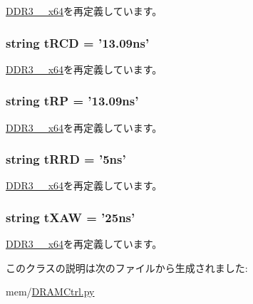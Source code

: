 \hyperlink{classDRAMCtrl_1_1DDR3__1600__x64_a1b5f15dad9d492ce5d0167e1581de8cc}{DDR3\_\_\-x64}を再定義しています。\hypertarget{classDRAMCtrl_1_1DDR3__2133__x64_a31691ebf1f58ff89b00f261f5adea8e2}{
\subsubsection[{tRCD}]{\setlength{\rightskip}{0pt plus 5cm}string {\bf tRCD} = '13.09ns'}}
\label{classDRAMCtrl_1_1DDR3__2133__x64_a31691ebf1f58ff89b00f261f5adea8e2}


\hyperlink{classDRAMCtrl_1_1DDR3__1600__x64_a31691ebf1f58ff89b00f261f5adea8e2}{DDR3\_\_\-x64}を再定義しています。\hypertarget{classDRAMCtrl_1_1DDR3__2133__x64_aeda425967c3cf2880bdc1640e9733439}{
\subsubsection[{tRP}]{\setlength{\rightskip}{0pt plus 5cm}string {\bf tRP} = '13.09ns'}}
\label{classDRAMCtrl_1_1DDR3__2133__x64_aeda425967c3cf2880bdc1640e9733439}


\hyperlink{classDRAMCtrl_1_1DDR3__1600__x64_aeda425967c3cf2880bdc1640e9733439}{DDR3\_\_\-x64}を再定義しています。\hypertarget{classDRAMCtrl_1_1DDR3__2133__x64_ad1724b7d6484bbc6051f43d4ae9e16d2}{
\subsubsection[{tRRD}]{\setlength{\rightskip}{0pt plus 5cm}string {\bf tRRD} = '5ns'}}
\label{classDRAMCtrl_1_1DDR3__2133__x64_ad1724b7d6484bbc6051f43d4ae9e16d2}


\hyperlink{classDRAMCtrl_1_1DDR3__1600__x64_ad1724b7d6484bbc6051f43d4ae9e16d2}{DDR3\_\_\-x64}を再定義しています。\hypertarget{classDRAMCtrl_1_1DDR3__2133__x64_a94c112e585153e09e803751da3cfafcd}{
\subsubsection[{tXAW}]{\setlength{\rightskip}{0pt plus 5cm}string {\bf tXAW} = '25ns'}}
\label{classDRAMCtrl_1_1DDR3__2133__x64_a94c112e585153e09e803751da3cfafcd}


\hyperlink{classDRAMCtrl_1_1DDR3__1600__x64_a94c112e585153e09e803751da3cfafcd}{DDR3\_\_\-x64}を再定義しています。

このクラスの説明は次のファイルから生成されました:\begin{DoxyCompactItemize}
\item 
mem/\hyperlink{DRAMCtrl_8py}{DRAMCtrl.py}\end{DoxyCompactItemize}
